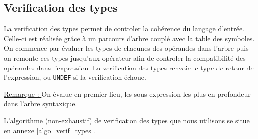 \newpage
\subsection{Verification des types}

La verification des types permet de controler la cohérence du langage d'entrée. Celle-ci est réalisée grâce à un parcours d'arbre couplé avec la table des symboles.
On commence par évaluer les types de chacunes des opérandes dans l'arbre puis on remonte ces types jusqu'aux opérateur afin de controler la compatibilité des opérandes dans l'expression. La verification des types renvoie le type de retour de l'expression, ou \verb?UNDEF? si la verification échoue.

\underline{Remarque : } On évalue en premier lieu, les sous-expression les plus en profondeur dans l'arbre syntaxique.

L'algorithme (non-exhaustif) de verification des types que nous utilisons se situe en annexe \ref{algo_verif_types}.
~~\\



